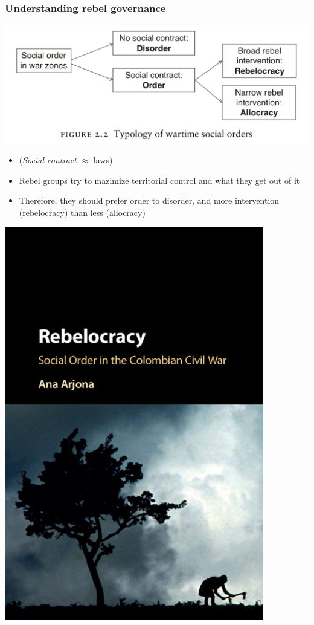 \documentclass[aspectratio=43]{beamer}
\begin{document}
\begin{frame}
\frametitle{Understanding rebel governance}
\centering

\begin{minipage}{0.7\textwidth}\centering
  \includegraphics[width = \textwidth]{img/arjona_typology}\\\vspace{10pt}
  \begin{itemize}[<+->]
    \item[] {\footnotesize (\textit{Social contract} $\approx$ laws)}
    \item Rebel groups try to mazimize territorial control and what they get out of it
    \item Therefore, they should prefer order to disorder, and more intervention (rebelocracy) than less (aliocracy)
  \end{itemize}
\end{minipage}\hfill
\begin{minipage}{0.29\textwidth}\centering
  \includegraphics[width = 0.85\textwidth]{img/arjona_rebelocracy}\\

\end{minipage}
\end{frame}
\end{document}

